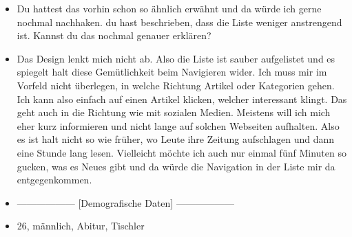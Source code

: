 {\begin{itemize}[]
                  Es muss ebenfalls angenehm zum Lesen sein und das Farbschema muss stimmen.
            \item {} Du hattest das vorhin schon so ähnlich erwähnt und da würde ich gerne nochmal nachhaken.
                  du hast beschrieben, dass die Liste weniger anstrengend ist.
                  Kannst du das nochmal genauer erklären?
            \item {} Das Design lenkt mich nicht ab.
                  Also die Liste ist sauber aufgelistet und es spiegelt halt diese Gemütlichkeit beim Navigieren wider.
                  Ich muss mir im Vorfeld nicht überlegen, in welche Richtung Artikel oder Kategorien gehen.
                  Ich kann also einfach auf einen Artikel klicken, welcher interessant klingt.
                  Das geht auch in die Richtung wie mit sozialen Medien.
                  Meistens will ich mich eher kurz informieren und nicht lange auf solchen Webseiten aufhalten.
                  Also es ist halt nicht so wie früher, wo Leute ihre Zeitung aufschlagen und dann eine Stunde lang lesen.
                  Vielleicht möchte ich auch nur einmal fünf Minuten so gucken, was es Neues gibt und da würde die Navigation in der Liste mir da entgegenkommen.
            \item {------------------} [Demografische Daten] {------------------}
            \item {} 26, männlich, Abitur, Tischler
      \end{itemize}}
\nolinenumbers
